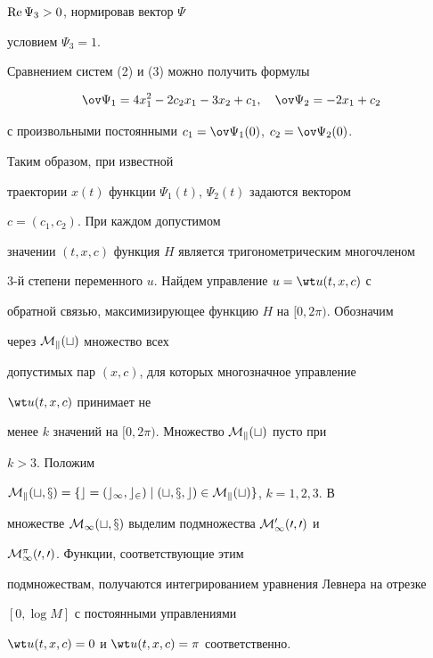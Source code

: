 $\operatorname{Re}\Psi_3>0$, нормировав вектор $\Psi$


условием $\Psi_3=1$.





Сравнением систем (2) и (3) можно получить формулы


\begin{equation}


\ov\Psi_1=4x^2_1-2c_2x_1-3x_2+c_1,\quad


\ov\Psi_2=-2x_1+c_2


\end{equation}


с произвольными постоянными $c_1=\ov\Psi_1(0)$, $c_2=\ov\Psi_2(0)$.


Таким образом, при известной


траектории $x(t)$ функции $\Psi_1(t)$, $\Psi_2(t)$ задаются вектором


$c=(c_1,c_2)$. При каждом допустимом


значении $(t,x,c)$ функция $H$ является тригонометрическим многочленом


3-й степени переменного $u$. Найдем управление $u=\wt u(t,x,c)$ с


обратной связью, максимизирующее функцию $H$ на $[0,2\pi)$. Обозначим


через $\cal M_k(t)$ множество всех


допустимых пар $(x,c)$, для которых многозначное управление


$\wt u(t,x,c)$ принимает не


менее $k$ значений на $[0,2\pi)$. Множество $\cal M_k(t)$ пусто при


$k> 3$. Положим


$\cal M_k(t,x)=\{c=(c_1,c_2)\mid(t,x,c)\in\cal M_k(t)\}$, $k=1,2,3$. В


множестве $\cal M_1(t,x)$ выделим подмножества $\cal M^0_1(0,0)$ и


$\cal M^\pi_1(0,0)$. Функции, соответствующие этим


подмножествам, получаются интегрированием уравнения Левнера на отрезке


$[0,\log M]$ с постоянными управлениями


$\wt u(t,x,c)=0$ и $\wt u(t,x,c)=\pi$ соответственно.





